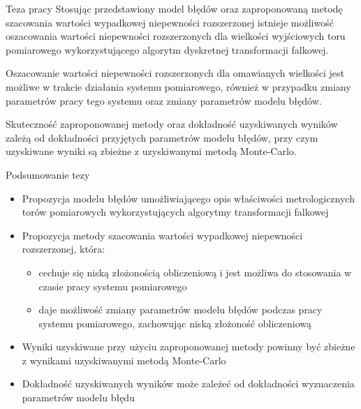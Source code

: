 \documentclass[12pt, polish, aspectratio = 169]{slides}
\begin{document}

\begin{frame}{Teza pracy}
\justifying
Stosując przedstawiony model błędów oraz zaproponowaną metodę szacowania wartości wypadkowej niepewności rozszerzonej istnieje możliwość oszacowania wartości niepewności rozszerzonych dla wielkości wyjściowych toru pomiarowego wykorzystującego algorytm dyskretnej transformacji falkowej.

Oszacowanie wartości niepewności rozszerzonych dla omawianych wielkości jest możliwe w trakcie działania systemu pomiarowego, również w przypadku zmiany parametrów pracy tego systemu oraz zmiany parametrów modelu błędów.

Skuteczność zaproponowanej metody oraz dokładność uzyskiwanych wyników zależą od dokładności przyjętych parametrów modelu błędów, przy czym uzyskiwane wyniki są zbieżne z uzyskiwanymi metodą Monte-Carlo.
\end{frame}

\begin{frame}{Podsumowanie tezy}
\begin{itemize}
\item Propozycja modelu błędów umożliwiającego opis właściwości metrologicznych torów pomiarowych wykorzystujących algorytmy transformacji falkowej
\item Propozycja metody szacowania wartości wypadkowej niepewności rozszerzonej, która:
	\begin{itemize}
	\item cechuje się niską złożonością obliczeniową i jest możliwa do stosowania w czasie pracy systemu pomiarowego
	\item daje możliwość zmiany parametrów modelu błędów podczas pracy systemu pomiarowego, zachowując niską złożoność obliczeniową
	\end{itemize}
\item Wyniki uzyskiwane przy użyciu zaproponowanej metody powinny być zbieżne z wynikami uzyskiwanymi metodą Monte-Carlo
\item Dokładność uzyskiwanych wyników może zależeć od dokładności wyznaczenia parametrów modelu błędu
\end{itemize}
\end{frame}


\end{document}
